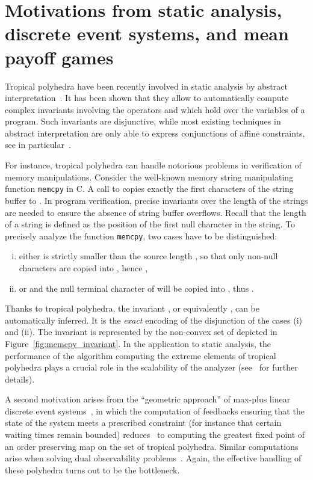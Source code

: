 \documentclass[proceedings]{stacs}
\begin{document}
\section{Motivations from static analysis, discrete event systems, and mean payoff games}\label{sec-motiv}
Tropical polyhedra have been recently involved in static analysis by abstract interpretation~\cite{AGG08}. It has been shown that they allow to automatically compute complex invariants involving the operators  and  which hold over the variables of a program. Such invariants are disjunctive, while most existing techniques in abstract interpretation are only able to express conjunctions of affine constraints, see in particular~\cite{CousotCousot77-1,CousotHalbwachs78-POPL,MineAst01}. 

For instance, tropical polyhedra can handle notorious problems in verification of memory manipulations. Consider the well-known memory string manipulating function \texttt{memcpy} in C. A call to  copies exactly the first  characters of the string buffer  to . In program verification, precise invariants over the length of the strings are needed to ensure the absence of string buffer overflows. Recall that the length of a string is defined as the position of the first null character in the string. To precisely analyze the function \texttt{memcpy}, two cases have to be distinguished: 
\begin{enumerate}[(i)]
\item either  is strictly smaller than the source length , so that only non-null characters are copied into , hence ,
\item or  and the null terminal character of  will be copied into , thus .
\end{enumerate}
Thanks to tropical polyhedra, the invariant , or equivalently , can be automatically inferred. It is the \emph{exact} encoding of the disjunction of the cases (i) and (ii). The invariant is represented by the non-convex set of  depicted in Figure~\ref{fig:memcpy_invariant}.
In the application to static analysis, the performance of the algorithm computing the extreme elements of tropical polyhedra plays a crucial role in the scalability of the analyzer (see~\cite{AGG08} for further details).


A second motivation arises from the ``geometric approach'' of max-plus linear
discrete event systems~\cite{ccggq99}, in which the computation of feedbacks
ensuring that the state of the system meets a prescribed
constraint (for instance that certain waiting times remain bounded)
reduces~\cite{katz05} to computing the greatest fixed
point of an order preserving map on the set of tropical
polyhedra. Similar computations arise when solving
dual observability problems~\cite{loiseau}.
Again, the effective handling of these polyhedra turns
out to be the bottleneck.
\end{document}
